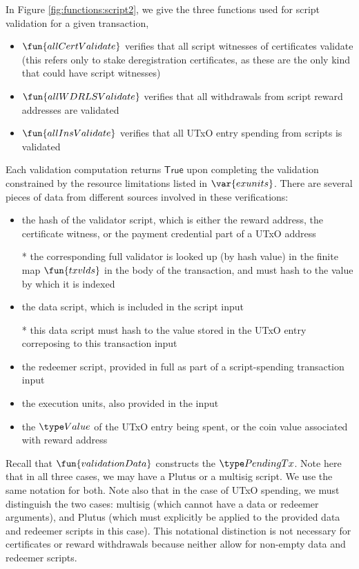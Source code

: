 In Figure \ref{fig:functions:script2}, we give the three functions
used for script validation for a given transaction,

\begin{itemize}
\item $\fun{allCertValidate}$ verifies that all script witnesses of certificates
validate (this refers only to stake deregistration certificates, as these are the
only kind that could have script witnesses)
\item $\fun{allWDRLSValidate}$ verifies that all withdrawals from script reward
addresses are validated
\item $\fun{allInsValidate}$ verifies that all UTxO entry spending from scripts
is validated
\end{itemize}

Each validation computation returns $\mathsf{True}$ upon completing
the validation constrained by the resource limitations listed in $\var{exunits}$.
There are several pieces of data from different sources involved in these
verifications:

\begin{itemize}
\item the hash of the validator script, which is either the reward address,
the certificate witness, or the payment credential part of a UTxO address

* the corresponding
full validator is looked up (by hash value) in the finite map $\fun{txvlds}$ in the
body of the transaction, and must hash to the value by which it is indexed

\item the data script, which is included in the script input

* this data script must hash to the value stored in the UTxO entry correposing to
this transaction input

\item the redeemer script, provided in full as part of a script-spending
transaction input

\item the execution units, also provided in the input

\item the $\Value$ of the UTxO entry being spent, or the coin value associated
with reward address
\end{itemize}

Recall that $\fun{validationData}$ constructs the $\PendingTx$.
Note here that in all three cases, we may have a Plutus or a multisig script.
We use the same notation for both. Note also that in the case of UTxO
spending, we must distinguish the two cases: multisig (which cannot
have a data or redeemer arguments), and Plutus (which must explicitly be
applied to the provided data and redeemer scripts in this case).
This notational distinction is not necessary for certificates or reward withdrawals
because neither allow for non-empty data and redeemer scripts.

